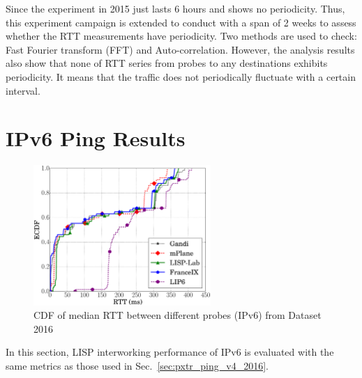 Since the experiment in 2015 just lasts 6 hours and shows no periodicity. Thus, this experiment campaign is extended to conduct with a span of 2 weeks to assess whether the RTT measurements have periodicity. Two methods are used to check: Fast Fourier transform (FFT) and Auto-correlation. However, the analysis results also show that none of RTT series from probes to any destinations exhibits periodicity. It means that the traffic does not periodically fluctuate with a certain interval.


\section{IPv6 Ping Results}
\label{sec:pxtr_ping_v6}
\begin{figure}[!t]
	\centering
	\includegraphics[width=0.6\textwidth]{Pics/v6/CDF_avg(RTT)_median_4_20.eps}
	\caption{CDF of median RTT between different probes (IPv6) from Dataset 2016}
	\label{CDF_of_median_RTT_between_different_probes_v6_2016}
\end{figure}

In this section, LISP interworking performance of IPv6 is evaluated with the same metrics as those used in Sec.~\ref{sec:pxtr_ping_v4_2016}.

